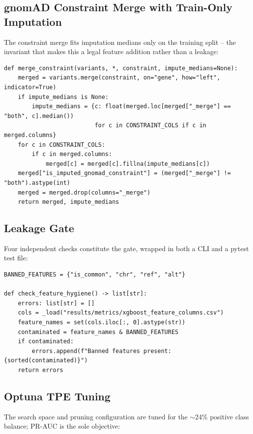 \documentclass[11pt,a4paper,oneside]{report}
\begin{document}
\subsection{gnomAD Constraint Merge with Train-Only Imputation}
\label{sec:impl-constraint}
The constraint merge fits imputation medians only on
the training split -- the invariant that makes this a
legal feature addition rather than a leakage:

\begin{lstlisting}[caption={Train-only median imputation in \texttt{src/gnomad\_constraint.py}.},label={lst:constraint}]
def merge_constraint(variants, *, constraint, impute_medians=None):
    merged = variants.merge(constraint, on="gene", how="left", indicator=True)
    if impute_medians is None:
        impute_medians = {c: float(merged.loc[merged["_merge"] == "both", c].median())
                          for c in CONSTRAINT_COLS if c in merged.columns}
    for c in CONSTRAINT_COLS:
        if c in merged.columns:
            merged[c] = merged[c].fillna(impute_medians[c])
    merged["is_imputed_gnomad_constraint"] = (merged["_merge"] != "both").astype(int)
    merged = merged.drop(columns="_merge")
    return merged, impute_medians
\end{lstlisting}

\subsection{Leakage Gate}
\label{sec:impl-leakage}
Four independent checks constitute the gate, wrapped in
both a CLI and a pytest test file:

\begin{lstlisting}[caption={Banned-feature check in \texttt{src/verify\_no\_leakage.py}.},label={lst:leakage}]
BANNED_FEATURES = {"is_common", "chr", "ref", "alt"}

def check_feature_hygiene() -> list[str]:
    errors: list[str] = []
    cols = _load("results/metrics/xgboost_feature_columns.csv")
    feature_names = set(cols.iloc[:, 0].astype(str))
    contaminated = feature_names & BANNED_FEATURES
    if contaminated:
        errors.append(f"Banned features present: {sorted(contaminated)}")
    return errors
\end{lstlisting}

\subsection{Optuna TPE Tuning}
\label{sec:impl-tpe}
The search space and pruning configuration are tuned
for the $\sim$24\% positive class balance; PR-AUC is
the sole objective:
\end{document}
